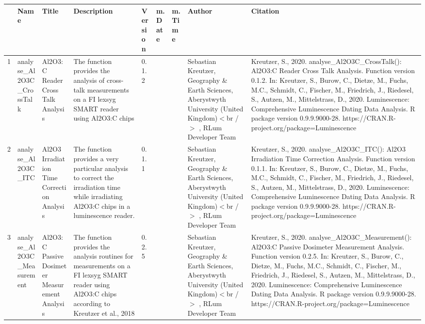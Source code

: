 \begin{table}[ht]
\centering
\begin{tabular}{rllllllll}
  \hline
 & Name & Title & Description & Version & m.Date & m.Time & Author & Citation \\ 
  \hline
1 & analyse\_Al2O3C\_CrossTalk & Al2O3:C Reader Cross Talk Analysis & The function provides the analysis of cross-talk measurements on a FI lexsyg SMART reader using Al2O3:C chips & 0.1.2
 &  &  & Sebastian Kreutzer, Geography \& Earth Sciences, Aberystwyth University (United Kingdom)$<$br /$>$ , RLum Developer Team & Kreutzer, S., 2020. analyse\_Al2O3C\_CrossTalk(): Al2O3:C Reader Cross Talk Analysis. Function version 0.1.2. In: Kreutzer, S., Burow, C., Dietze, M., Fuchs, M.C., Schmidt, C., Fischer, M., Friedrich, J., Riedesel, S., Autzen, M., Mittelstrass, D., 2020. Luminescence: Comprehensive Luminescence Dating Data Analysis. R package version 0.9.9.9000-28. https://CRAN.R-project.org/package=Luminescence
 \\ 
  2 & analyse\_Al2O3C\_ITC & Al2O3 Irradiation Time Correction Analysis & The function provides a very particular analysis to correct the irradiation time while irradiating Al2O3:C chips in a luminescence reader. & 0.1.1
 &  &  & Sebastian Kreutzer, Geography \& Earth Sciences, Aberystwyth University (United Kingdom)$<$br /$>$ , RLum Developer Team & Kreutzer, S., 2020. analyse\_Al2O3C\_ITC(): Al2O3 Irradiation Time Correction Analysis. Function version 0.1.1. In: Kreutzer, S., Burow, C., Dietze, M., Fuchs, M.C., Schmidt, C., Fischer, M., Friedrich, J., Riedesel, S., Autzen, M., Mittelstrass, D., 2020. Luminescence: Comprehensive Luminescence Dating Data Analysis. R package version 0.9.9.9000-28. https://CRAN.R-project.org/package=Luminescence
 \\ 
  3 & analyse\_Al2O3C\_Measurement & Al2O3:C Passive Dosimeter Measurement Analysis & The function provides the analysis routines for measurements on a FI lexsyg SMART reader using Al2O3:C chips according to Kreutzer et al., 2018 & 0.2.5
 &  &  & Sebastian Kreutzer, Geography \& Earth Sciences, Aberystwyth University (United Kingdom)$<$br /$>$ , RLum Developer Team & Kreutzer, S., 2020. analyse\_Al2O3C\_Measurement(): Al2O3:C Passive Dosimeter Measurement Analysis. Function version 0.2.5. In: Kreutzer, S., Burow, C., Dietze, M., Fuchs, M.C., Schmidt, C., Fischer, M., Friedrich, J., Riedesel, S., Autzen, M., Mittelstrass, D., 2020. Luminescence: Comprehensive Luminescence Dating Data Analysis. R package version 0.9.9.9000-28. https://CRAN.R-project.org/package=Luminescence

\end{tabular}
\end{table}
